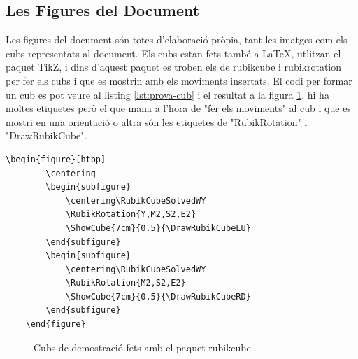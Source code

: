 \subsection{Les Figures del Document}

Les figures del document són totes d'elaboració pròpia, tant les imatges com els cubs representats al document. 
Els cubs estan fets també a LaTeX, utlitzan el paquet TikZ, i dins d'aquest paquet es troben els de rubikcube i rubikrotation per fer els cubs i que es mostrin amb els moviments insertats.
El codi per formar un cub es pot veure al listing \ref{lst:prova-cub} i el resultat a la figura \ref{fig:cubs-latex}, hi ha moltes etiquetes però el que mana a l'hora de "fer els moviments" al cub i que es mostri en una orientació o altra són les etiquetes de "RubikRotation" i "DrawRubikCube". 
\vspace{3cm}

\begin{lstlisting}[style=latex, caption={Exemple de Cubs fets amb el paquet rubikcube}, label={lst:prova-cub}]
    \begin{figure}[htbp]
        \centering
        \begin{subfigure}
            \centering\RubikCubeSolvedWY
            \RubikRotation{Y,M2,S2,E2}
            \ShowCube{7cm}{0.5}{\DrawRubikCubeLU}
        \end{subfigure}
        \begin{subfigure}
            \centering\RubikCubeSolvedWY
            \RubikRotation{M2,S2,E2}
            \ShowCube{7cm}{0.5}{\DrawRubikCubeRD}
        \end{subfigure}
    \end{figure}
\end{lstlisting}

\begin{figure}[htbp]
    \centering
    \begin{subfigure}
        \centering\RubikCubeSolvedWY
    \end{subfigure}
    \begin{subfigure}
        \centering\RubikCubeSolvedWY
    \end{subfigure}
    \caption{Cubs de demostració fets amb el paquet rubikcube}
    \label{fig:cubs-latex}
\end{figure}
